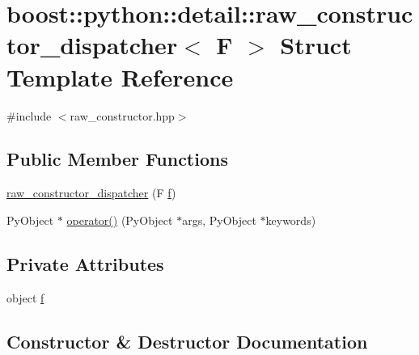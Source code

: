 \hypertarget{structboost_1_1python_1_1detail_1_1raw__constructor__dispatcher}{}\section{boost\+:\+:python\+:\+:detail\+:\+:raw\+\_\+constructor\+\_\+dispatcher$<$ F $>$ Struct Template Reference}
\label{structboost_1_1python_1_1detail_1_1raw__constructor__dispatcher}


{\ttfamily \#include $<$raw\+\_\+constructor.\+hpp$>$}

\subsection*{Public Member Functions}
\begin{DoxyCompactItemize}
\item 
\hyperlink{structboost_1_1python_1_1detail_1_1raw__constructor__dispatcher_a24c048cfc2d50e1897e6a779eef33f5c}{raw\+\_\+constructor\+\_\+dispatcher} (F \hyperlink{structboost_1_1python_1_1detail_1_1raw__constructor__dispatcher_a055de51d7e8492c050508aa131ec1dd5}{f})
\item 
Py\+Object $\ast$ \hyperlink{structboost_1_1python_1_1detail_1_1raw__constructor__dispatcher_ae3fe9c3c2b28ec59a57468fc05381a96}{operator()} (Py\+Object $\ast$args, Py\+Object $\ast$keywords)
\end{DoxyCompactItemize}
\subsection*{Private Attributes}
\begin{DoxyCompactItemize}
\item 
object \hyperlink{structboost_1_1python_1_1detail_1_1raw__constructor__dispatcher_a055de51d7e8492c050508aa131ec1dd5}{f}
\end{DoxyCompactItemize}


\subsection{Constructor \& Destructor Documentation}
\hypertarget{structboost_1_1python_1_1detail_1_1raw__constructor__dispatcher_a24c048cfc2d50e1897e6a779eef33f5c}{}
